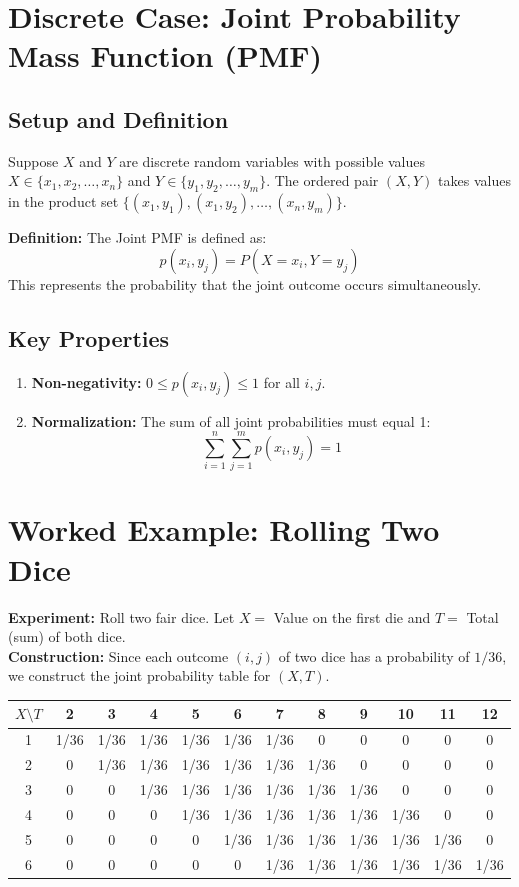 \documentclass[11pt]{article}
\begin{document}
\section{Discrete Case: Joint Probability Mass Function (PMF)}
\subsection*{Setup and Definition}
Suppose $X$ and $Y$ are discrete random variables with possible values $X \in \{x_1, x_2, \dots, x_n\}$ and $Y \in \{y_1, y_2, \dots, y_m\}$. The ordered pair $(X, Y)$ takes values in the product set $\{(x_1, y_1), (x_1, y_2), \dots, (x_n, y_m)\}$.

\textbf{Definition:} The Joint PMF is defined as:
\[ p(x_i, y_j) = P(X = x_i, Y = y_j) \]
This represents the probability that the joint outcome occurs simultaneously.

\subsection*{Key Properties}
\begin{enumerate}
    \item \textbf{Non-negativity:} $0 \le p(x_i, y_j) \le 1$ for all $i, j$.
    \item \textbf{Normalization:} The sum of all joint probabilities must equal 1:
    \[ \sum_{i=1}^{n} \sum_{j=1}^{m} p(x_i, y_j) = 1 \]
\end{enumerate}

\section{Worked Example: Rolling Two Dice}
\textbf{Experiment:} Roll two fair dice. Let $X =$ Value on the first die and $T =$ Total (sum) of both dice. \\
\textbf{Construction:} Since each outcome $(i, j)$ of two dice has a probability of $1/36$, we construct the joint probability table for $(X, T)$.

\begin{table}[h]
\centering
\small
\begin{tabular}{c|ccccccccccc}
\toprule
$X \setminus T$ & 2 & 3 & 4 & 5 & 6 & 7 & 8 & 9 & 10 & 11 & 12 \\
\midrule
1 & 1/36 & 1/36 & 1/36 & 1/36 & 1/36 & 1/36 & 0 & 0 & 0 & 0 & 0 \\
2 & 0 & 1/36 & 1/36 & 1/36 & 1/36 & 1/36 & 1/36 & 0 & 0 & 0 & 0 \\
3 & 0 & 0 & 1/36 & 1/36 & 1/36 & 1/36 & 1/36 & 1/36 & 0 & 0 & 0 \\
4 & 0 & 0 & 0 & 1/36 & 1/36 & 1/36 & 1/36 & 1/36 & 1/36 & 0 & 0 \\
5 & 0 & 0 & 0 & 0 & 1/36 & 1/36 & 1/36 & 1/36 & 1/36 & 1/36 & 0 \\
6 & 0 & 0 & 0 & 0 & 0 & 1/36 & 1/36 & 1/36 & 1/36 & 1/36 & 1/36 \\
\bottomrule
\end{tabular}
\end{table}
\end{document}
